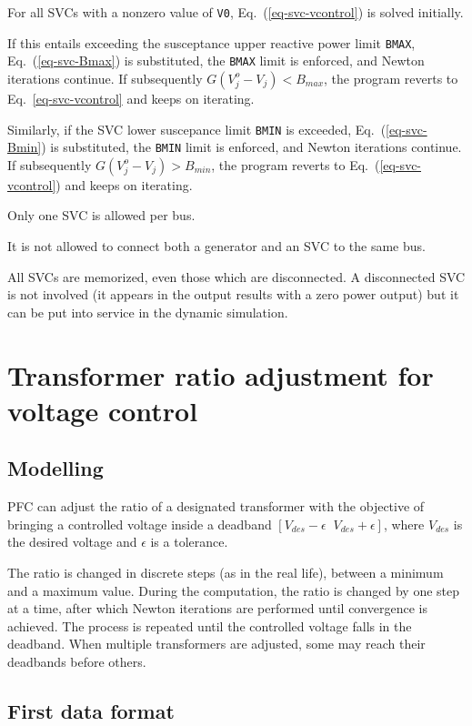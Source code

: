 For all SVCs with a nonzero value of {\tt V0}, Eq.~(\ref{eq-svc-vcontrol}) is solved initially.

If this entails exceeding the susceptance upper reactive power limit {\tt BMAX}, Eq.~(\ref{eq-svc-Bmax}) is substituted, the {\tt BMAX} limit is enforced, and Newton iterations continue. If subsequently $G(V_j^o-V_j)< B_{max}$, the program reverts to Eq.~\ref{eq-svc-vcontrol} and keeps on iterating.

Similarly, if the SVC lower suscepance limit {\tt BMIN} is exceeded, Eq.~(\ref{eq-svc-Bmin}) is substituted, the {\tt BMIN} limit is enforced, and Newton iterations continue. If subsequently $G(V_j^o-V_j) > B_{min}$, the program reverts to Eq.~(\ref{eq-svc-vcontrol}) and keeps on iterating.

Only one SVC is allowed per bus. 

It is not allowed to connect both a generator and an SVC to the same bus.

All SVCs are memorized, even those which are disconnected. A disconnected SVC is not involved (it appears in the output results with a zero power output) but it can be put into service in the
dynamic simulation.


\section{Transformer ratio adjustment for voltage control}\label{sec-pf-ltc}

\subsection{Modelling}

PFC can adjust the ratio of a designated transformer with the objective of bringing a controlled voltage inside a deadband $[V_{des}-\epsilon \;\; V_{des}+\epsilon]$, where $V_{des}$ is the desired voltage and $\epsilon$ is a tolerance.

The ratio is changed in discrete steps (as in the real life), between a minimum and a maximum value. During the computation, the ratio is changed by one step at a time, after which Newton iterations are performed until convergence is achieved. The process is repeated until the controlled voltage falls in the deadband. When multiple transformers are adjusted, some may reach their deadbands before others.

\subsection{First data format}

